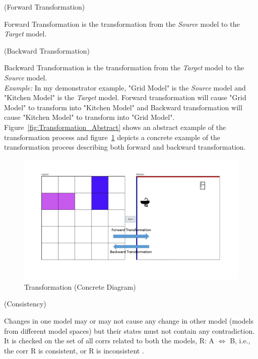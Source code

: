 \begin{defn}\label{deffwdTransformation } (Forward Transformation) \end{defn} 
Forward Transformation is the transformation from the \textit{Source} model to the \textit{Target} model.\\

\begin{defn}\label{defbkdTransformation } (Backward Transformation) \end{defn} 
Backward Transformation is the transformation from the \textit{Target} model to the \textit{Source} model.\\

\textit{Example:} In my demonstrator example, "Grid Model" is the \textit{Source} model and "Kitchen Model" is the \textit{Target} model. Forward transformation will cause "Grid Model" to transform into "Kitchen Model" and Backward transformation will cause "Kitchen Model" to transform into "Grid Model". Figure~\ref{fig:Transformation_Abstract} shows an abstract example of the transformation process and figure~\ref{fig:Transformation_Concrete} depicts a concrete example of the transformation process describing both forward and backward transformation.\\

\begin{figure}
	\includegraphics[width=1\textwidth]{figures/Transformation_Concrete}
	\caption{Transformation (Concrete Diagram)}
	\label{fig:Transformation_Concrete}
\end{figure}

\begin{defn}\label{defConsistency } (Consistency) \end{defn} 
Changes in one model may or may not cause any change in other model (models from different model spaces) but their states must not contain any contradiction. It is checked on the set of all corrs related to both the models, R: A $\Longleftrightarrow$ B, i.e., the corr R is consistent, or R is inconsistent \cite{benchmarx-reload}.

